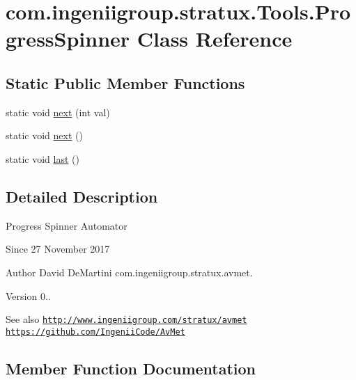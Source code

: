 \hypertarget{classcom_1_1ingeniigroup_1_1stratux_1_1_tools_1_1_progress_spinner}{}\section{com.\+ingeniigroup.\+stratux.\+Tools.\+Progress\+Spinner Class Reference}
\label{classcom_1_1ingeniigroup_1_1stratux_1_1_tools_1_1_progress_spinner}
\subsection*{Static Public Member Functions}
\begin{DoxyCompactItemize}
\item 
static void \hyperlink{classcom_1_1ingeniigroup_1_1stratux_1_1_tools_1_1_progress_spinner_ae8617b5bd74c11372402fad5813a9821}{next} (int val)
\item 
static void \hyperlink{classcom_1_1ingeniigroup_1_1stratux_1_1_tools_1_1_progress_spinner_ac4063af8c709e2ad028547c9cebc9ffd}{next} ()
\item 
static void \hyperlink{classcom_1_1ingeniigroup_1_1stratux_1_1_tools_1_1_progress_spinner_a22f7be1b96e05dceb296272269aa5f15}{last} ()
\end{DoxyCompactItemize}


\subsection{Detailed Description}
Progress Spinner Automator

\begin{DoxySince}{Since}
27 November 2017 
\end{DoxySince}
\begin{DoxyAuthor}{Author}
David De\+Martini  com.\+ingeniigroup.\+stratux.\+avmet. 
\end{DoxyAuthor}
\begin{DoxyVersion}{Version}
0.. 
\end{DoxyVersion}
\begin{DoxySeeAlso}{See also}
\href{http://www.ingeniigroup.com/stratux/avmet}{\tt http\+://www.\+ingeniigroup.\+com/stratux/avmet}  \href{https://github.com/IngeniiCode/AvMet}{\tt https\+://github.\+com/\+Ingenii\+Code/\+Av\+Met} 
\end{DoxySeeAlso}


\subsection{Member Function Documentation}
\mbox{\label{classcom_1_1ingeniigroup_1_1stratux_1_1_tools_1_1_progress_spinner_a22f7be1b96e05dceb296272269aa5f15}} 

